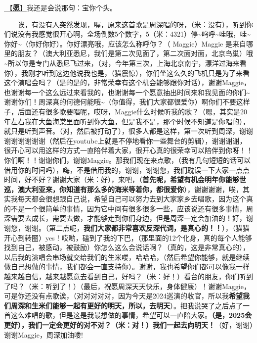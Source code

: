 \documentclass[]{ctexbook}
\begin{document}
\hyperref[wish]{🎵【\textbf{愿}】}我还是会说那句：宝你个头。

  诶，有没有人突然发现，喔，原来这首歌是周深唱的呀，（米：没有），听到你们说没有我感觉很开心啊，全场倒数5个数字，5（米：4321）停\textasciitilde 呜呼\textasciitilde 哇哦，哇\textasciitilde 你好\textasciitilde（你好你好）。你好漂亮哦，应该怎么称呼你？（ Maggie）Maggie 是来自哪里的朋友？（澳大利亚悉尼，我们是第二次见面了，第二次面对面，北京鸟巢）哦\textasciitilde 所以你是专门从悉尼飞过来，（对，今年第三次，上海北京南宁，漂洋过海来看你），我刚才听到这边他说我也是，（猫震惊），你们坐这么久的飞机只是为了来看这个演唱会吗？（是的是的，非常荣幸有这个机会能够跟你对话），谢谢Maggie，也谢谢每一个这么远过来看我的，也谢谢每一个愿意抽出时间来和我见面的你们\textasciitilde 谢谢你们！周深真的何德何能哦\textasciitilde（你值得，我们大家都很爱你）啊你们不要这样子，后面还有很多歌要唱呢，哎呀，Maggie什么时候听我的歌？（嗯，其实是20年左右我在大鱼海棠里面听到你大鱼，但是我不是，那个时候不知道是你唱的），就只是听到声音。（对，然后被打动了），很多人都是这样，第一次听到周深，谢谢谢谢谢谢谢谢（然后在youtube上就是不停地看你一些舞台的剪辑），谢谢谢谢，很开心可以用这样的方式一直陪伴着大家，很开心真的很荣幸可以陪伴到你呀！！你们啊！！谢谢你们，谢谢Maggie。那我们现在来点歌，（我有几句短短的话可以借用你的时间吗），嗨，不是借用我的，谢谢，谢谢您，我们耽误一下大家一点点时间，好不好？谢谢大家（米：好），来吧，（\textbf{首先呢，希望有机会明年你能够世巡，澳大利亚来，你知道有那么多的海米等着你，都很爱你}），谢谢谢谢，唉，其实我每天都会很想跟自己说，希望自己可以努力去到大家家乡去唱歌，因为这个真的不是一个很简单的事情，因为它中间有很多很多一些，应该说还有很多事情，周深需要去成长，需要去做，才能够走到你们身边，但是周深一定会加油的！好，谢谢您，谢谢。（第二点呢，\textbf{我们大家都非常喜欢反深代词，是真心的！！}），（猫猫开心到转圈）yes！哎哟，磕到了我的下巴，（那里面的12个化身，真的每个人能够找到自己，被感动，被鼓励）你怎么这么会说话啊？（真的，这是非常真心的），以后我的演唱会串场就交给我们的生米喽，哈哈哈，（然后希望你能够，就是继续做自己想做的事情，我们都会一直支持你）。谢谢，我也希望你们都可以像我一样越来越自信，越来越愿意去看到自己，好吗？（米：好！）看台的朋友，你们听到了吗？（米：听到了！）（最后，祝愿周深天天快乐，身体健康）！谢谢Maggie，可是你还没有点歌诶，（对对对对对，因为今天是2024巡演的收官，所以我\textbf{希望我们周深和生米们能够一起有更好的明天，所以，去明天}）。把我说哭了之后点了一首这么难唱的歌，但是这是我最想做的事情，希望可以一直陪大家。\textbf{（是，2025会更好），我们一定会更好的对不对？（米：对！）我们一起去向明天！}（好，谢谢）谢谢Maggie，周深加油喽!
\end{document}
